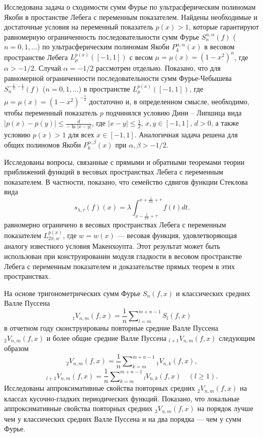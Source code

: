 
Исследована задача о сходимости сумм Фурье по ультрасферическим полиномам Якоби в простанстве Лебега с переменным показателем. Найдены необходимые и достаточные условия на переменный показатель $p(x)>1$, которые гарантируют равномерную ограниченность последовательности  сумм Фурье $S_n^{\alpha,\alpha}(f)$ ($n=0,1,\ldots$) по ультрасферическим полиномам Якоби $P_k^{\alpha,\alpha}(x)$
в весовом пространстве Лебега $L_\mu^{p(x)}([-1,1])$ с весом $\mu=\mu(x)=(1-x^2)^\alpha$, где $\alpha>-1/2$. Случай $\alpha=-1/2$ рассмотрен отдельно. Показано, что для равномерной ограниченности  последовательности  сумм Фурье-Чебышева $S_n^{-\frac12,-\frac12}(f)$ ($n=0,1,\ldots$) в пространстве $L_\mu^{p(x)}([-1,1])$, где $\mu=\mu(x)=(1-x^2)^{-\frac12}$ достаточно и, в определенном смысле,  необходимо, чтобы переменный показатель $p$ подчинялся условию Дини -- Липшица  вида $|p(x)-p(y)|\le \frac{d}{-\ln|x-y|}$, где $|x-y|\le\frac12$, $x,y\in[-1,1]$, $d>0$, а также условию $p(x)>1$ для всех $x\in[-1,1]$.
Аналогичная задача решена для общих полиномов Якоби $P_k^{\alpha,\beta}(x)$ при $\alpha,\beta>-1/2$.



Исследованы вопросы, связанные с прямыми и обратными теоремами теории приближений функций в весовых пространствах Лебега  с переменным показателем. В частности, показано, что семейство сдвигов функции Стеклова вида
$$s_{\lambda,\tau}(f)(x) = \lambda \int_{x-\frac{1}{2\lambda}+\tau}^{x+\frac{1}{2\lambda}+\tau} f(t)dt.$$
равномерно ограничено в весовых пространствах Лебега с переменным показателем $L_{2\pi, w}^{p(x)}$, где $w = w(x)$ --- весовая функция, удовлетворяющая аналогу известного условия Макенхоупта.
Этот результат может быть использован при конструировании модуля гладкости в весовом пространстве Лебега с переменным показателем и доказательстве прямых теорем в этих пространствах.






На основе тригонометрических сумм Фурье $S_n(f,x)$ и классических средних Валле Пуссена
$$
_1V_{n,m}(f,x)= \frac1n\sum\nolimits_{l=m}^{m+n-1}S_l(f,x)
$$
 в отчетном году сконструированы повторные средние Валле Пуссена ${}_2 V_{n,m}(f,x)$ и более общие средние Валле Пуссена ${}_{l+1}V_{n,m}(f,x)$
 следующим образом
 $$
_2V_{n,m}(f,x)= \frac1n\sum\nolimits_{k=m}^{m+n-1}{}_1V_{n,k}(f,x),
$$
$$
{}_{l+1}V_{n,m}(f,x)= \frac1n\sum\nolimits_{k=m}^{m+n-1} {}_{l}V_{n,k}(f,x)\quad(l\ge1).
$$
Исследованы аппроксимативные свойства повторных средних ${}_2 V_{n,m}(f,x)$ на классах кусочно-гладких периодических функций. Показано, что локальные аппроксимативные свойства повторных средних ${}_2V_{n,m}(f,x)$ на порядок лучше чем у классических средних Валле Пуссена и на два порядка --- чем у сумм Фурье.

